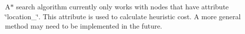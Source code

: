 
\begin{DoxyItemize}
\item A$\ast$ search algorithm currently only works with nodes that have attribute \char`\"{}location\-\_\-\char`\"{}. This attribute is used to calculate heuristic cost. A more general method may need to be implemented in the future. 
\end{DoxyItemize}